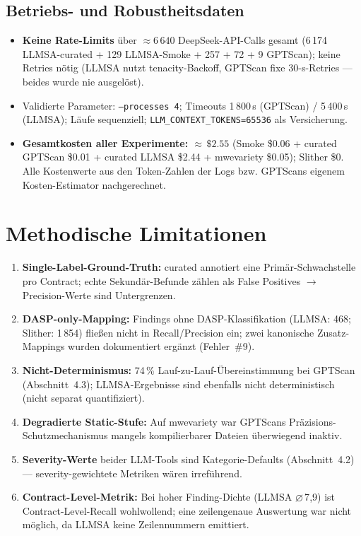 \documentclass[11pt,a4paper]{scrartcl}
\newcommand{\code}[1]{\texttt{#1}}
\begin{document}
\subsection{Betriebs- und Robustheitsdaten}

\begin{itemize}[nosep]
  \item \textbf{Keine Rate-Limits} über ${\approx}6\,640$ DeepSeek-API-Calls gesamt (6\,174 LLMSA-curated + 129 LLMSA-Smoke + 257 + 72 + 9 GPTScan); keine Retries nötig (LLMSA nutzt tenacity-Backoff, GPTScan fixe 30-s-Retries --- beides wurde nie ausgelöst).
  \item Validierte Parameter: \code{--processes 4}; Timeouts 1\,800\,s (GPTScan) / 5\,400\,s (LLMSA); Läufe sequenziell; \code{LLM\_CONTEXT\_TOKENS=65536} als Versicherung.
  \item \textbf{Gesamtkosten aller Experimente: ${\approx}\,\$2.55$} (Smoke \$0.06 + curated GPTScan \$0.01 + curated LLMSA \$2.44 + mwevariety \$0.05); Slither \$0. Alle Kostenwerte aus den Token-Zahlen der Logs bzw. GPTScans eigenem Kosten-Estimator nachgerechnet.
\end{itemize}

\section{Methodische Limitationen}

\begin{enumerate}[nosep]
  \item \textbf{Single-Label-Ground-Truth:} curated annotiert eine Primär-Schwachstelle pro Contract; echte Sekundär-Befunde zählen als False Positives $\rightarrow$ Precision-Werte sind Untergrenzen.
  \item \textbf{DASP-only-Mapping:} Findings ohne DASP-Klassifikation (LLMSA: 468; Slither: 1\,854) fließen nicht in Recall/Precision ein; zwei kanonische Zusatz-Mappings wurden dokumentiert ergänzt (Fehler~\#9).
  \item \textbf{Nicht-Determinismus:} 74\,\% Lauf-zu-Lauf-Übereinstimmung bei GPTScan (Abschnitt~4.3); LLMSA-Ergebnisse sind ebenfalls nicht deterministisch (nicht separat quantifiziert).
  \item \textbf{Degradierte Static-Stufe:} Auf mwevariety war GPTScans Präzisions-Schutzmechanismus mangels kompilierbarer Dateien überwiegend inaktiv.
  \item \textbf{Severity-Werte} beider LLM-Tools sind Kategorie-Defaults (Abschnitt~4.2) --- severity-gewichtete Metriken wären irreführend.
  \item \textbf{Contract-Level-Metrik:} Bei hoher Finding-Dichte (LLMSA $\varnothing$\,7{,}9) ist Contract-Level-Recall wohlwollend; eine zeilengenaue Auswertung war nicht möglich, da LLMSA keine Zeilennummern emittiert.
\end{enumerate}
\end{document}
